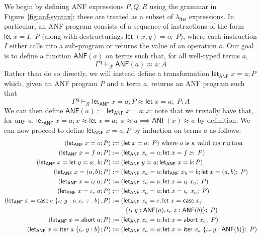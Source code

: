 \documentclass[acmsmall,screen,anonymous,review]{acmart}
\newcommand{\mc}[1]{\ensuremath{\mathcal{#1}}}
\newcommand{\mb}[1]{\ensuremath{\mathbf{#1}}}
\newcommand{\ms}[1]{\ensuremath{\mathsf{#1}}}
\newcommand{\lto}{:}
\newcommand{\linl}[1]{\iota_l\;{#1}}
\newcommand{\linr}[1]{\iota_r\;{#1}}
\newcommand{\labort}[1]{\ms{abort}\;{#1}}
\newcommand{\letexpr}[3]{\ensuremath{\ms{let}\;#1 = #2;\;#3}}
\newcommand{\caseexpr}[5]{\ms{case}\;#1\;\{\linl{#2} \lto #3, \linr{#4} \lto #5\}}
\newcommand{\liter}[3]{\ms{iter}\;#1\;\{ \linr{#2} \lto #3 \}}
\newcommand{\teqv}{\approx}
\newcommand{\tmeq}[5]{#1 \vdash_{#2} #3 \teqv #4 : {#5}}
\newcommand{\toanf}[1]{\ms{ANF}(#1)}
\newcommand{\anflet}[3]{\ms{let}_{\ms{ANF}}\;#1 = #2; #3}
\newcommand{\subiterexp}{\texorpdfstring{\(\lambda_{\ms{iter}}\)}{lambda-iter}}
\begin{document}
We begin by defining ANF expressions $P, Q, R$ using the grammar in Figure~\ref{fig:anf-syntax};
these are treated as a subset of \subiterexp{} expressions. In particular, an ANF program consists
of a sequence of instructions of the form $\letexpr{x}{I}{P}$ (along with destructurings
$\letexpr{(x, y)}{o}{P}$), where each instruction $I$ either calls into a sub-program or returns the
value of an operation $o$. Our goal is to define a function $\toanf{a}$ on terms such that, for
all well-typed terms $a$,
\begin{equation*}
  \tmeq{\Gamma^{\mb{q}}}{\mc{R}}{\toanf{a}}{a}{A}
\end{equation*}
Rather than do so directly, we will instead define a transformation $\anflet{x}{a}{P}$ which, given
an ANF program $P$ and a term $a$, returns an ANF program such that
\begin{equation*}
  \tmeq{\Gamma^{\mb{q}}}{\mc{R}}{\anflet{x}{a}{P}}{\letexpr{x}{a}{P}}{A}
\end{equation*}
We can then define $\toanf{a} := \anflet{x}{a}{x}$; note that we trivially have that, for any $a$,
$\anflet{x}{a}{x} \approx \letexpr{x}{a}{x} \approx a \implies \toanf{x} \approx a$ by definition.
We can now proceed to define $\anflet{x}{a}{P}$ by induction on terms $a$ as follows:
\begin{align*}
  (\anflet{x}{o}{P}) &:= (\letexpr{x}{o}{P}) \text{ where } o \text{ is a valid instruction} \\
  (\anflet{x}{f\;a}{P}) &:= (\anflet{x_a}{a}{\letexpr{x}{f\;x}{P}}) \\
  (\anflet{x}{\letexpr{y}{a}{b}}{P}) &:= (\anflet{y}{a}{\anflet{x}{b}{P}}) \\
  (\anflet{x}{(a, b)}{P}) &:= (\anflet{x_a}{a}{\anflet{x_b}{b}{\letexpr{x}{(a, b)}{P}}}) \\
  (\anflet{x}{\linl{a}}{P}) &:= (\anflet{x_a}{a}{\letexpr{x}{\linl{x_a}}{P}}) \\
  (\anflet{x}{\linr{a}}{P}) &:= (\anflet{x_a}{a}{\letexpr{x}{\linr{x_a}}{P}}) \\
  (\anflet{x}{\caseexpr{e}{y}{a}{z}{b}}{P}) 
    &:= (\anflet{x_e}{e}{\letexpr{x}{\caseexpr{x_e \\ & \qquad}{y}{\toanf{a}}{z}{\toanf{b}}}}{P}) \\
  (\anflet{x}{\labort{a}}{P}) &:= (\anflet{x_a}{a}{\letexpr{x}{\labort{x_a}}{P}}) \\
  (\anflet{x}{\liter{a}{y}{b}}{P}) 
    &:= (\anflet{x_a}{a}{\letexpr{x}{\liter{x_a}{y}{\toanf{b}}}{P}})
\end{align*}
\end{document}
